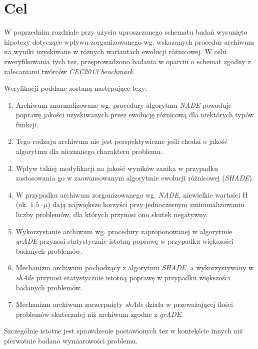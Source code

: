 \documentclass[12pt,a4paper]{report}
\begin{document}
{{{{{{{\section{Cel}
\par{
W poprzednim rozdziale przy użyciu uproszczonego schematu badań wysunięto hipotezy dotyczące wpływu zorganizowanego wg. wskazanych procedur archiwum na wyniki uzyskiwane w różnych wariantach ewolucji różnicowej. W celu zweryfikowania tych tez, przeprowadzono badania w oparciu o schemat zgodny z zalecaniami twórców \emph{CEC2013 benchmark}.
}
\par{
Weryfikacji poddane zostaną następujące tezy:
\begin{enumerate}
\item Archiwum znormalizowane wg. procedury algorytmu \emph{NADE} powoduje poprawę jakości uzyskiwanych przez ewolucję różnicową dla niektórych typów funkcji.
\item Tego rodzaju archiwum nie jest perspektywiczne jeśli chodzi o jakość algorytmu dla nieznanego charakteru problemu.
\item Wpływ takiej modyfikacji na jakość wyników zanika w przypadku zastosowania go w zaawansowanym algorytmie ewolucji różnicowej (\emph{SHADE}).
\item W przypadku archiwum zorganizowanego wg. \emph{NADE}, niewielkie wartości H (ok. $1.5 \cdot \mu$) dają największe korzyści przy jednoczesnym zminimalizowaniu liczby problemów, dla których przynosi ono skutek negatywny.
\item Wykorzystanie archiwum wg. procedury zaproponowanej w algorytmie \emph{grADE} przynosi statystycznie istotną poprawę w przypadku większości badanych problemów.
\item Mechanizm archiwum pochodzący z algorytmu \emph{SHADE}, a wykorzystywany w \emph{shAde} przynosi statystycznie istotną poprawę w przypadku większości badanych problemów.
\item Mechanizm archiwum zaczerpnięty \emph{shAde} działa w przeważającej ilości problemów skuteczniej niż archiwum zgodne z \emph{grADE}.
\end{enumerate}
}
\par{
Szczególnie istotne jest sprawdzenie postawionych tez w kontekście innych niż pierwotnie badano wymiarowości problemu.
}

}}}}}}}
\end{document}
